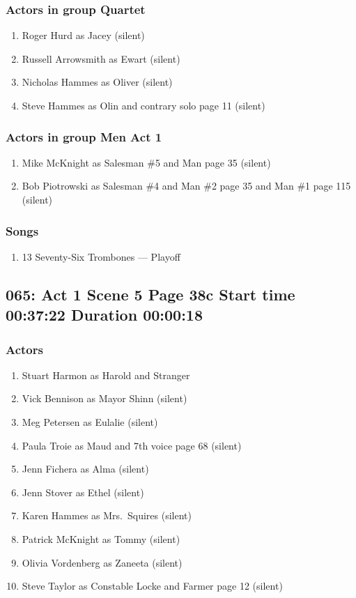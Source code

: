 \subsubsection{Actors in group Quartet}
\begin{enumerate}
\item Roger Hurd as Jacey (silent)
\item Russell Arrowsmith as Ewart (silent)
\item Nicholas Hammes as Oliver (silent)
\item Steve Hammes as Olin and contrary solo page 11 (silent)
\end{enumerate}
\subsubsection{Actors in group Men Act 1}
\begin{enumerate}
\item Mike McKnight as Salesman \#5 and Man page 35 (silent)
\item Bob Piotrowski as Salesman \#4 and Man \#2 page 35 and Man \#1 page 115 (silent)
\end{enumerate}

\subsubsection{Songs}
\begin{enumerate}
\item 13 Seventy-Six Trombones --- Playoff
\end{enumerate}
\subsection{065: Act 1 Scene 5 Page 38c Start time 00:37:22 Duration 00:00:18}

\subsubsection{Actors}
\begin{enumerate}
\item Stuart Harmon as Harold and Stranger
\item Vick Bennison as Mayor Shinn (silent)
\item Meg Petersen as Eulalie (silent)
\item Paula Troie as Maud and 7th voice page 68 (silent)
\item Jenn Fichera as Alma (silent)
\item Jenn Stover as Ethel (silent)
\item Karen Hammes as Mrs.~Squires (silent)
\item Patrick McKnight as Tommy (silent)
\item Olivia Vordenberg as Zaneeta (silent)
\item Steve Taylor as Constable Locke and Farmer page 12 (silent)
\end{enumerate}
